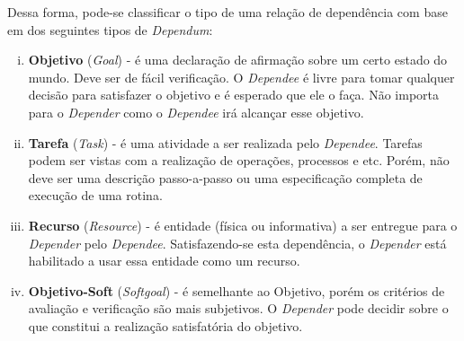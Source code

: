                 Dessa forma, pode-se classificar o tipo de uma relação de dependência com base em dos seguintes tipos de \emph{Dependum}:
                \begin{enumerate}[i.]
                    \item \textbf{Objetivo} (\emph{Goal}) - é uma declaração de afirmação sobre um certo estado do mundo. Deve ser de fácil verificação. O \emph{Dependee} é livre para tomar qualquer decisão para satisfazer o objetivo e é esperado que ele o faça. Não importa para o \emph{Depender} como o \emph{Dependee} irá alcançar esse objetivo.
                    \item \textbf{Tarefa} (\emph{Task}) - é uma atividade a ser realizada pelo \emph{Dependee}. Tarefas podem ser vistas com a realização de operações, processos e etc. Porém, não deve ser uma descrição passo-a-passo ou uma especificação completa de execução de uma rotina.
                    \item \textbf{Recurso} (\emph{Resource}) - é entidade (física ou informativa) a ser entregue para o \emph{Depender} pelo \emph{Dependee}. Satisfazendo-se esta dependência, o \emph{Depender} está habilitado a usar essa entidade como um recurso.
                    \item \textbf{Objetivo-Soft} (\emph{Softgoal}) - é semelhante ao Objetivo, porém os critérios de avaliação e verificação são mais subjetivos. O \emph{Depender} pode decidir sobre o que constitui a realização satisfatória do objetivo.
                \end{enumerate}
            
